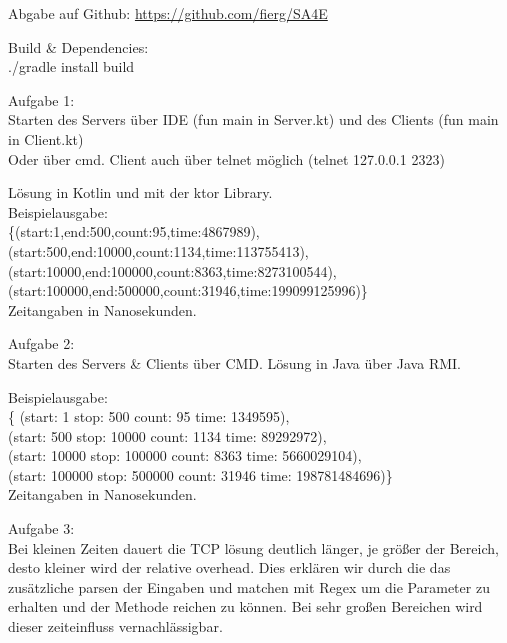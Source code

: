 \documentclass[10pt,a4paper]{article}
\begin{document}
	
\begin{boxedminipage}[t][17cm][t]{\textwidth}
	\par{
	Abgabe auf Github:
	\url{https://github.com/fierg/SA4E}
	
	\medskip
	
	Build \& Dependencies:\\
	./gradle install build\\
}

	\par{

	
	Aufgabe 1:\\
	Starten des Servers über IDE (fun main in Server.kt) und des Clients (fun main in Client.kt)\\
	Oder über cmd.
	Client auch über telnet möglich (telnet 127.0.0.1 2323)
	
	
	Lösung in Kotlin und mit der ktor Library.\\
	Beispielausgabe:\\
\{(start:1,end:500,count:95,time:4867989),\\
(start:500,end:10000,count:1134,time:113755413),\\
(start:10000,end:100000,count:8363,time:8273100544),\\
(start:100000,end:500000,count:31946,time:199099125996)\}\\

	Zeitangaben in Nanosekunden.\\
}


	\par{
		Aufgabe 2:\\
		Starten des Servers \& Clients über CMD.
		Lösung in Java über Java RMI.
		
		Beispielausgabe:\\
	\{ (start: 1 stop: 500 count: 95 time: 1349595),\\
(start: 500 stop: 10000 count: 1134 time: 89292972),\\
(start: 10000 stop: 100000 count: 8363 time: 5660029104),\\
(start: 100000 stop: 500000 count: 31946 time: 198781484696)\}\\
	
	Zeitangaben in Nanosekunden.\\
		
	}
	
	
	\par{
	Aufgabe 3:\\
	Bei kleinen Zeiten dauert die TCP lösung deutlich länger, je größer der Bereich, desto kleiner wird der relative overhead. Dies erklären wir durch die das zusätzliche parsen der Eingaben und matchen mit Regex um die Parameter zu erhalten und der Methode reichen zu können. Bei sehr großen Bereichen wird dieser zeiteinfluss vernachlässigbar.
}
	
\end{boxedminipage}	
\end{document}
